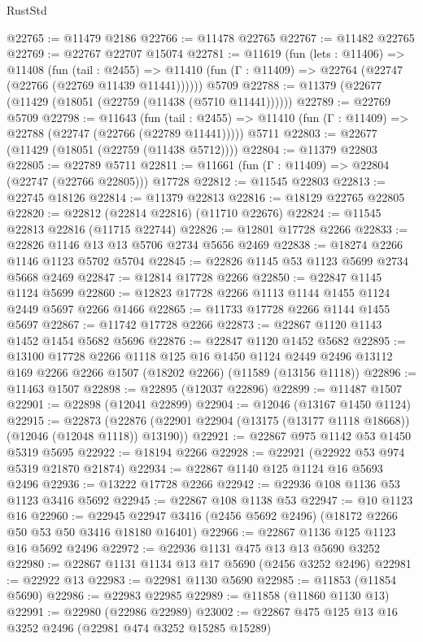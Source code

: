\begin{lexlean}{RustStd}
\begin{coremodule}
@22765 := @11479 @2186
@22766 := @11478 @22765
@22767 := @11482 @22765
@22769 := @22767 @22707 @15074
@22781 := @11619
    (fun (lets : @11406) =>
    @11408
      (fun (tail : @2455) =>
      @11410 (fun (Γ : @11409) => @22764 (@22747 (@22766 (@22769 @11439 @11441))))))
    @5709
@22788 := @11379 (@22677 (@11429 (@18051 (@22759 (@11438 (@5710 @11441))))))
@22789 := @22769 @5709
@22798 := @11643
    (fun (tail : @2455) => @11410 (fun (Γ : @11409) => @22788 (@22747 (@22766 (@22789 @11441)))))
    @5711
@22803 := @22677 (@11429 (@18051 (@22759 (@11438 @5712))))
@22804 := @11379 @22803
@22805 := @22789 @5711
@22811 := @11661 (fun (Γ : @11409) => @22804 (@22747 (@22766 @22805))) @17728
@22812 := @11545 @22803
@22813 := @22745 @18126
@22814 := @11379 @22813
@22816 := @18129 @22765 @22805
@22820 := @22812 (@22814 @22816) (@11710 @22676)
@22824 := @11545 @22813 @22816 (@11715 @22744)
@22826 := @12801 @17728 @2266
@22833 := @22826 @1146 @13 @13 @5706 @2734 @5656 @2469
@22838 := @18274 @2266 @1146 @1123 @5702 @5704
@22845 := @22826 @1145 @53 @1123 @5699 @2734 @5668 @2469
@22847 := @12814 @17728 @2266
@22850 := @22847 @1145 @1124 @5699
@22860 := @12823 @17728 @2266 @1113 @1144 @1455 @1124 @2449 @5697 @2266 @1466
@22865 := @11733 @17728 @2266 @1144 @1455 @5697
@22867 := @11742 @17728 @2266
@22873 := @22867 @1120 @1143 @1452 @1454 @5682 @5696
@22876 := @22847 @1120 @1452 @5682
@22895 := @13100
    @17728
    @2266
    @1118
    @125
    @16
    @1450
    @1124
    @2449
    @2496
    @13112
    @169
    @2266
    @2266
    @1507
    (@18202 @2266)
    (@11589 (@13156 @1118))
@22896 := @11463 @1507
@22898 := @22895 (@12037 @22896)
@22899 := @11487 @1507
@22901 := @22898 (@12041 @22899)
@22904 := @12046 (@13167 @1450 @1124)
@22915 := @22873
    (@22876 (@22901 @22904 (@13175 (@13177 @1118 @18668)) (@12046 (@12048 @1118)) @13190))
@22921 := @22867 @975 @1142 @53 @1450 @5319 @5695
@22922 := @18194 @2266
@22928 := @22921 (@22922 @53 @974 @5319 @21870 @21874)
@22934 := @22867 @1140 @125 @1124 @16 @5693 @2496
@22936 := @13222 @17728 @2266
@22942 := @22936 @108 @1136 @53 @1123 @3416 @5692
@22945 := @22867 @108 @1138 @53
@22947 := @10 @1123 @16
@22960 := @22945 @22947 @3416 (@2456 @5692 @2496) (@18172 @2266 @50 @53 @50 @3416 @18180 @16401)
@22966 := @22867 @1136 @125 @1123 @16 @5692 @2496
@22972 := @22936 @1131 @475 @13 @13 @5690 @3252
@22980 := @22867 @1131 @1134 @13 @17 @5690 (@2456 @3252 @2496)
@22981 := @22922 @13
@22983 := @22981 @1130 @5690
@22985 := @11853 (@11854 @5690)
@22986 := @22983 @22985
@22989 := @11858 (@11860 @1130 @13)
@22991 := @22980 (@22986 @22989)
@23002 := @22867 @475 @125 @13 @16 @3252 @2496 (@22981 @474 @3252 @15285 @15289)

\end{coremodule}
\end{lexlean}
